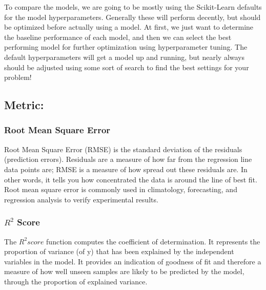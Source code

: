 \documentclass{article}
\begin{document}

To compare the models, we are going to be mostly using the Scikit-Learn defaults for the model hyperparameters. Generally these will perform decently, but should be optimized before actually using a model. At first, we just want to determine the baseline performance of each model, and then we can select the best performing model for further optimization using hyperparameter tuning. The default hyperparameters will get a model up and running, but nearly always should be adjusted using some sort of search to find the best settings for your problem!

\subsection*{Metric:}
\subsubsection*{Root Mean Square Error}
Root Mean Square Error (RMSE) is the standard deviation of the residuals (prediction errors). Residuals are a measure of how far from the regression line data points are; RMSE is a measure of how spread out these residuals are. In other words, it tells you how concentrated the data is around the line of best fit. Root mean square error is commonly used in climatology, forecasting, and regression analysis to verify experimental results.

\subsubsection*{$R^2$ Score}
The $R^2score$ function computes the coefficient of determination. It represents the proportion of variance (of y) that has been explained by the independent variables in the model. It provides an indication of goodness of fit and therefore a measure of how well unseen samples are likely to be predicted by the model, through the proportion of explained variance.


\end{document}
\end{itemize}
\end{document}
